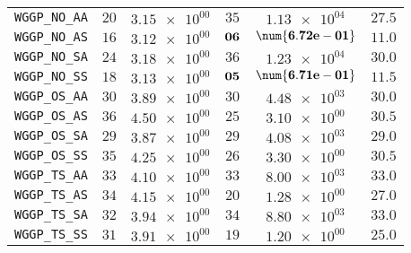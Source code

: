 \begin{xltabular}{\textwidth}{l||CC|CC||C}
	\texttt{WGGP\_NO\_AA} & $ 20$ & $ \num{3.15e+00}$ & $ 35$ & $ \num{1.13e+04}$ &$ 27.5$  \\
	\texttt{WGGP\_NO\_AS} & $ 16$ & $ \num{3.12e+00}$ & $\bf 06$ & $\bf \num{6.72e-01}$ &$ 11.0$  \\
	\texttt{WGGP\_NO\_SA} & $ 24$ & $ \num{3.18e+00}$ & $ 36$ & $ \num{1.23e+04}$ &$ 30.0$  \\
	\texttt{WGGP\_NO\_SS} & $ 18$ & $ \num{3.13e+00}$ & $\bf 05$ & $\bf \num{6.71e-01}$ &$ 11.5$  \\
	\texttt{WGGP\_OS\_AA} & $ 30$ & $ \num{3.89e+00}$ & $ 30$ & $ \num{4.48e+03}$ &$ 30.0$  \\
	\texttt{WGGP\_OS\_AS} & $ 36$ & $ \num{4.50e+00}$ & $ 25$ & $ \num{3.10e+00}$ &$ 30.5$  \\
	\texttt{WGGP\_OS\_SA} & $ 29$ & $ \num{3.87e+00}$ & $ 29$ & $ \num{4.08e+03}$ &$ 29.0$  \\
	\texttt{WGGP\_OS\_SS} & $ 35$ & $ \num{4.25e+00}$ & $ 26$ & $ \num{3.30e+00}$ &$ 30.5$  \\
	\texttt{WGGP\_TS\_AA} & $ 33$ & $ \num{4.10e+00}$ & $ 33$ & $ \num{8.00e+03}$ &$ 33.0$  \\
	\texttt{WGGP\_TS\_AS} & $ 34$ & $ \num{4.15e+00}$ & $ 20$ & $ \num{1.28e+00}$ &$ 27.0$  \\
	\texttt{WGGP\_TS\_SA} & $ 32$ & $ \num{3.94e+00}$ & $ 34$ & $ \num{8.80e+03}$ &$ 33.0$  \\
	\texttt{WGGP\_TS\_SS} & $ 31$ & $ \num{3.91e+00}$ & $ 19$ & $ \num{1.20e+00}$ &$ 25.0$  \\
\end{xltabular}
